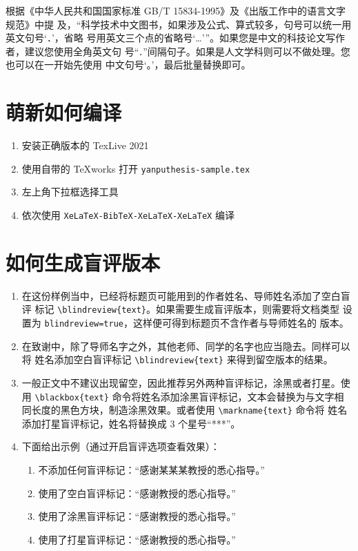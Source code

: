 \documentclass[lang=chs, degree=phd, blindreview=false, winfonts=true, academic=true]{yanputhesis}
\begin{document}
根据《中华人民共和国国家标准 GB/T 15834-1995》及《出版工作中的语言文字规范》中提
及，“科学技术中文图书，如果涉及公式、算式较多，句号可以统一用英文句号‘．’，省略
号用英文三个点的省略号‘…’”。如果您是中文的科技论文写作者，建议您使用全角英文句
号“\lstinline`．`”间隔句子。如果是人文学科则可以不做处理。您也可以在一开始先使用
中文句号‘。’，最后批量替换即可。

\section{萌新如何编译}

\begin{enumerate}
    \setlength{\itemsep}{0pt}
    \item 安装正确版本的 TexLive 2021
    \item 使用自带的 TeXworks 打开 \lstinline`yanputhesis-sample.tex`
    \item 左上角下拉框选择工具
    \item 依次使用 \lstinline`XeLaTeX-BibTeX-XeLaTeX-XeLaTeX` 编译
\end{enumerate}

\section{如何生成盲评版本}

\begin{enumerate}
    \setlength{\itemsep}{0pt}
    \item 在这份样例当中，已经将标题页可能用到的作者姓名、导师姓名添加了空白盲评
          标记 \lstinline`\blindreview{text}`。如果需要生成盲评版本，则需要将文档类型
          设置为 \lstinline`blindreview=true`，这样便可得到标题页不含作者与导师姓名的
          版本。
    \item 在致谢中，除了导师名字之外，其他老师、同学的名字也应当隐去。同样可以将
          姓名添加空白盲评标记 \lstinline`\blindreview{text}` 来得到留空版本的结果。
    \item 一般正文中不建议出现留空，因此推荐另外两种盲评标记，涂黑或者打星。使用
          \lstinline`\blackbox{text}` 命令将姓名添加涂黑盲评标记，文本会替换为与文字相
          同长度的黑色方块，制造涂黑效果。或者使用 \lstinline`\markname{text}` 命令将
          姓名添加打星盲评标记，姓名将替换成 3 个星号“***”。
    \item 下面给出示例（通过开启盲评选项查看效果）：
          \begin{enumerate}
              \setlength{\itemsep}{0pt}
              \item 不添加任何盲评标记：“感谢某某某教授的悉心指导。”
              \item 使用了空白盲评标记：“感谢教授的悉心指导。”
              \item 使用了涂黑盲评标记：“感谢教授的悉心指导。”
              \item 使用了打星盲评标记：“感谢教授的悉心指导。”
          \end{enumerate}
\end{enumerate}
\end{document}
